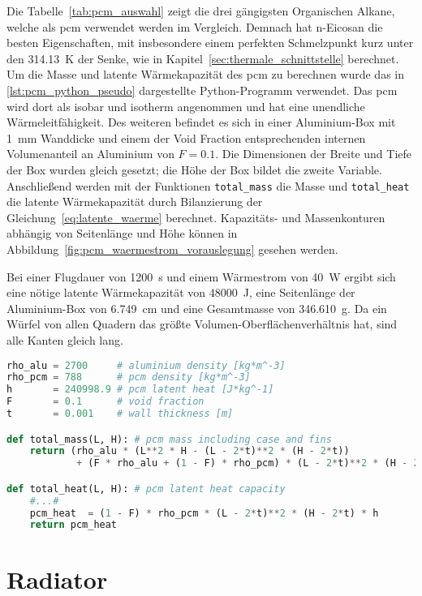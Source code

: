 Die Tabelle~\ref{tab:pcm_auswahl} zeigt die drei gängigsten Organischen Alkane, welche als \ac{pcm} verwendet werden im Vergleich.
Demnach hat n-Eicosan die besten Eigenschaften, mit insbesondere einem perfekten Schmelzpunkt kurz unter den \SI{314,13}{\kelvin} der Senke,
wie in Kapitel~\ref{sec:thermale_schnittstelle} berechnet.
Um die Masse und latente Wärmekapazität des \ac{pcm} zu berechnen wurde das in \ref{lst:pcm_python_pseudo} dargestellte Python-Programm verwendet.
Das \ac{pcm} wird dort als isobar und isotherm angenommen und hat eine unendliche Wärmeleitfähigkeit. Des weiteren befindet es sich
in einer Aluminium-Box mit \SI{1}{\milli\meter} Wanddicke und einem der Void Fraction entsprechenden internen Volumenanteil an  Aluminium von $F = 0.1$.
Die Dimensionen der Breite und Tiefe der Box wurden gleich gesetzt; die Höhe der Box bildet die zweite Variable.
Anschließend werden mit der Funktionen \texttt{total\_mass} die Masse und \texttt{total\_heat} die latente Wärmekapazität durch Bilanzierung
der Gleichung~\ref{eq:latente_waerme} berechnet.
Kapazitäts- und Massenkonturen abhängig von Seitenlänge und Höhe können in Abbildung~\ref{fig:pcm_waermestrom_vorauslegung} gesehen werden.

Bei einer Flugdauer von \SI{1200}{\second} und einem Wärmestrom von \SI{40}{\watt} ergibt sich eine nötige latente Wärmekapazität von
\SI{48000}{\joule}, eine Seitenlänge der Aluminium-Box von \SI{6,749}{\centi\meter} und eine Gesamtmasse von \SI{346,610}{\gram}.
Da ein Würfel von allen Quadern das größte Volumen-Oberflächenverhältnis hat, sind alle Kanten gleich lang.

\begin{lstlisting}[float, language=Python, caption={Berechnung der Masse und Latenten Wärmekapazität des \ac{pcm} in der pcm.py}, label={lst:pcm_python_pseudo}]
rho_alu = 2700     # aluminium density [kg*m^-3]
rho_pcm = 788      # pcm density [kg*m^-3]
h       = 240998.9 # pcm latent heat [J*kg^-1]
F       = 0.1      # void fraction
t       = 0.001    # wall thickness [m]

def total_mass(L, H): # pcm mass including case and fins
    return (rho_alu * (L**2 * H - (L - 2*t)**2 * (H - 2*t))
            + (F * rho_alu + (1 - F) * rho_pcm) * (L - 2*t)**2 * (H - 2*t)) 

def total_heat(L, H): # pcm latent heat capacity
    #...#
    pcm_heat  = (1 - F) * rho_pcm * (L - 2*t)**2 * (H - 2*t) * h
    return pcm_heat
\end{lstlisting}

\section{Radiator}\label{sec:Radiator}

